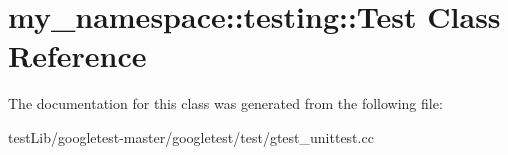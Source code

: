 \hypertarget{classmy__namespace_1_1testing_1_1Test}{}\section{my\+\_\+namespace\+:\+:testing\+:\+:Test Class Reference}
\label{classmy__namespace_1_1testing_1_1Test}


The documentation for this class was generated from the following file\+:\begin{DoxyCompactItemize}
\item 
test\+Lib/googletest-\/master/googletest/test/gtest\+\_\+unittest.\+cc\end{DoxyCompactItemize}
